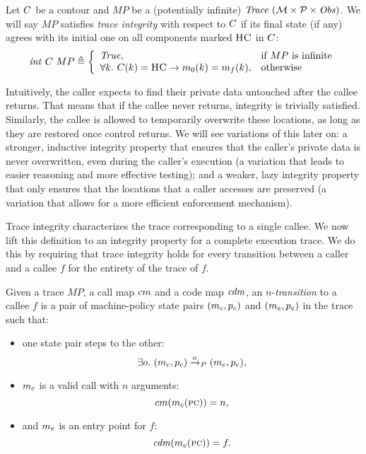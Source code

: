 \documentclass[acmsmall,review,anonymous]{acmart}\settopmatter{printfolios=true,printccs=false,printacmref=false}
\begin{document}
\label{def:trace-integrity}
Let $C$ be a contour and $MP$ be a (potentially infinite)
$\mathit{Trace}~({\mathcal M} \times \mathcal{P} \times \mathit{Obs})$. We will say $MP$ satisfies {\em trace integrity} with
respect to $C$ if its final state (if any) agrees with its
initial one on all components marked $\textsc{HC}$ in $C$:
%
\[
\mathit{int} ~ C ~ MP \triangleq
\left \{ \begin{array}{ll}
  \mathit{True}, & \text{if $MP$ is infinite}\\
  \forall k. ~ C(k) = \textsc{HC} \rightarrow m_0(k) = m_f(k), & \text{otherwise} \\
\end{array}
\right .
\]

Intuitively, the caller expects to find their private data untouched
after the callee returns. That means that if the callee never returns,
integrity is trivially satisfied. Similarly, the callee is allowed to
temporarily overwrite these locations, as long as they are restored
once control returns. We will see variations of this later on: a
stronger, inductive integrity property that ensures that the caller's
private data is never overwritten, even during the caller's execution
(a variation that leads to easier reasoning and more effective testing);
and a weaker, lazy integrity property that only ensures that the
locations that a caller accesses are preserved (a variation that allows
for a more efficient enforcement mechanism).

Trace integrity characterizes the trace corresponding to a single
callee. We now lift this definition to an integrity property for a
complete execution trace. We do this by requiring that trace integrity
holds for every transition between a caller and a callee $f$ for
the entirety of the trace of $f$.

Given a trace $MP$, a call map $cm$ and a code map $\mathit{cdm}$,
an $n$-{\em transition} to a callee $f$ is a pair of machine-policy
state pairs $(m_c, p_c)$ and $(m_e, p_e)$ in the trace
such that:
\begin{itemize}
\item one state pair steps to the other:
  $$\exists o. ~ (m_c, p_c) \xrightarrow{o}_P (m_e, p_e),$$
\item $m_c$ is a valid call with $n$ arguments:
  $$cm(m_c(\textsc{pc})) = n,$$
\item and $m_e$ is an entry point for $f$:
  $$\mathit{cdm}(m_e(\textsc{pc})) = f.$$
\end{itemize}
\end{document}
